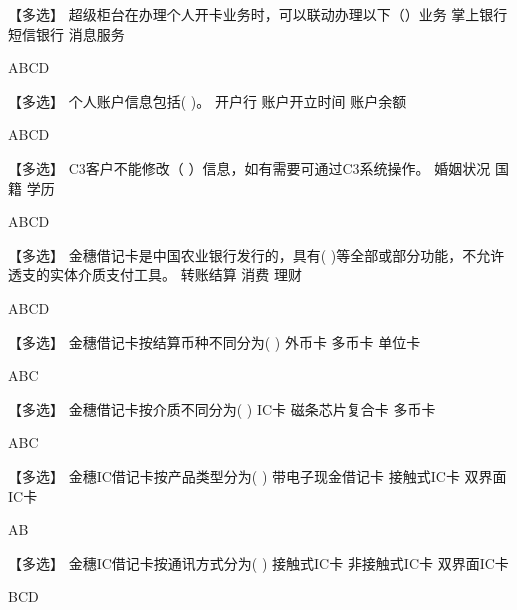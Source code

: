 \documentclass[kindlepaper]{BHCexam4kindle}
\begin{document}
\begin{questions}
\qs 【多选】 超级柜台在办理个人开卡业务时，可以联动办理以下（）业务 \xx
{} {  掌上银行 } { 短信银行 } { 消息服务 }
\begin{solution} ABCD \end{solution}
\qs 【多选】 个人账户信息包括(    )。 \xx
{} {  开户行 } { 账户开立时间 } { 账户余额 }
\begin{solution} ABCD \end{solution}
\qs 【多选】 C3客户不能修改（  ）信息，如有需要可通过C3系统操作。 \xx
{} {  婚姻状况 } { 国籍 } { 学历 }
\begin{solution} ABCD \end{solution}
\qs 【多选】 金穗借记卡是中国农业银行发行的，具有(    )等全部或部分功能，不允许透支的实体介质支付工具。 \xx
{} {  转账结算 } { 消费 } { 理财 }
\begin{solution} ABCD \end{solution}
\qs 【多选】 金穗借记卡按结算币种不同分为(    ) \xx
{} {  外币卡 } { 多币卡 } { 单位卡 }
\begin{solution} ABC \end{solution}
\qs 【多选】 金穗借记卡按介质不同分为(    ) \xx
{} {  IC卡 } { 磁条芯片复合卡 } { 多币卡 }
\begin{solution} ABC \end{solution}
\qs 【多选】 金穗IC借记卡按产品类型分为(    ) \xx
{} {  带电子现金借记卡 } { 接触式IC卡 } { 双界面IC卡 }
\begin{solution} AB \end{solution}
\qs 【多选】 金穗IC借记卡按通讯方式分为(    ) \xx
{} {  接触式IC卡 } { 非接触式IC卡 } { 双界面IC卡 }
\begin{solution} BCD \end{solution}

\end{questions}
\end{document}
